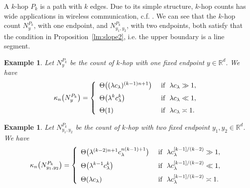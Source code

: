 \documentclass[12pt]{article}
\newcommand{\R}{\mathbb{R}}
\newtheorem{remark}[prop]{Remark}
\newtheorem{example}[prop]{Example}
\numberwithin{equation}{section}
\begin{document}

A $k$-hop $P_k$ is a path with $k$ edges. Due to its simple structure, $k$-hop counts has wide applications in wireless communication, c.f. \cite{privault19}. We can see that the $k$-hop count $N_{y}^{P_k}$, with one endpoint, and $N_{y_1,y_2}^{P_k}$, with two endpoints, both satisfy that the condition in Proposition~\ref{lm:slope2}, i.e. the upper boundary is a line segment. 

\begin{example}
  Let $N_{y}^{P_k}$ be the count of $k$-hop with one fixed endpoint $y\in\R^d$. We have 
  \begin{eqnarray}
    \kappa_n\big(N_{y}^{P_k}\big)=\left\{\begin{array}{ll}
      \Theta\big((\lambda c_\lambda)^{(k-1)n+1}\big) & \ \mbox{if }\ \lambda c_\lambda\gg1,
      \medskip
      \\
      \displaystyle
\Theta\big(\lambda^{k}c_\lambda^{k}\big) & \ \mbox{if }\ \lambda c_\lambda\ll1,
    \medskip
    \\
    \displaystyle
    \Theta(1) & \ \mbox{if }\ \lambda c_\lambda\asymp1.
    \end{array}
    \right.
  \end{eqnarray}
\end{example}
\begin{example}
  Let $N_{y_1,y_2}^{P_k}$ be the count of $k$-hop with two fixed endpoint $y_1,y_2\in\R^d$. We have 
  \begin{eqnarray}
    \kappa_n\big(N_{y_1,y_2}^{P_k}\big)=\left\{\begin{array}{ll}
      \Theta\big(\lambda^{(k-2)n+1}c_\lambda^{n(k-1)+1}\big) & \ \mbox{if }\ \lambda c_\lambda^{[k-1]/ ( k-2 )}\gg1,
      \medskip
      \\
      \displaystyle
\Theta\big(\lambda^{k-1}c_\lambda^{k}\big) & \ \mbox{if }\ \lambda c_\lambda^{[k-1]/ ( k-2 )}\ll1,
    \medskip
    \\
    \displaystyle
    \Theta(\lambda c_\lambda) & \ \mbox{if }\ \lambda c_\lambda^{[k-1]/ ( k-2 )}\asymp1.
    \end{array}
    \right.
  \end{eqnarray}
\end{example}
\end{document}

